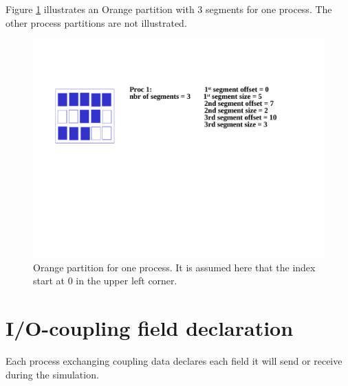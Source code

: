 Figure \ref{orange_partition} illustrates an Orange partition with 3 segments
for one process. The other process partitions are not illustrated.

\begin{figure}
\includegraphics[scale=.6]{figures/orange_new} 
\caption{Orange partition for one process. It is assumed here that the index start at 0 in the upper left corner.}
\label{orange_partition}
\end{figure} 


\section{I/O-coupling field declaration}
 \label{subsubsec_Declaration}

Each process exchanging coupling data declares each field it will send
or receive during the simulation. 


